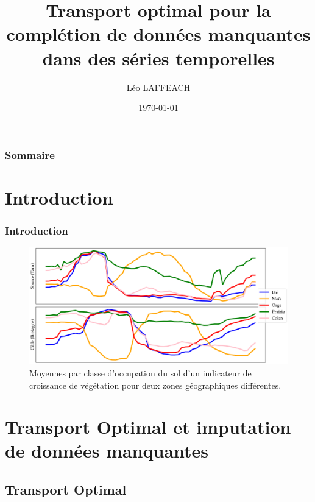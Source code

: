 \documentclass{beamer}
\title[Complétion de données]{Transport optimal pour la complétion de données manquantes dans des séries temporelles }
\author{Léo LAFFEACH}
\institute[ENS Rennes] 
{
ENS Rennes\\ 
}
\date{\today}
\begin{document}
\begin{frame}
\titlepage 
\end{frame}

\begin{frame}
\frametitle{Sommaire} 
\tableofcontents
\end{frame}


\section{Introduction}

\begin{frame}
\frametitle{Introduction}

\begin{figure}[H]
    \centering
    \includegraphics[scale = 0.25]{images/exemple_serie_temps.png}
    \caption{Moyennes par classe d'occupation du sol d'un indicateur de croissance de végétation pour deux zones géographiques différentes.}
    \label{exemple_intro}
\end{figure}

\end{frame}

\section{Transport Optimal et imputation de données manquantes}

\subsection{Transport Optimal} 
\end{document}
